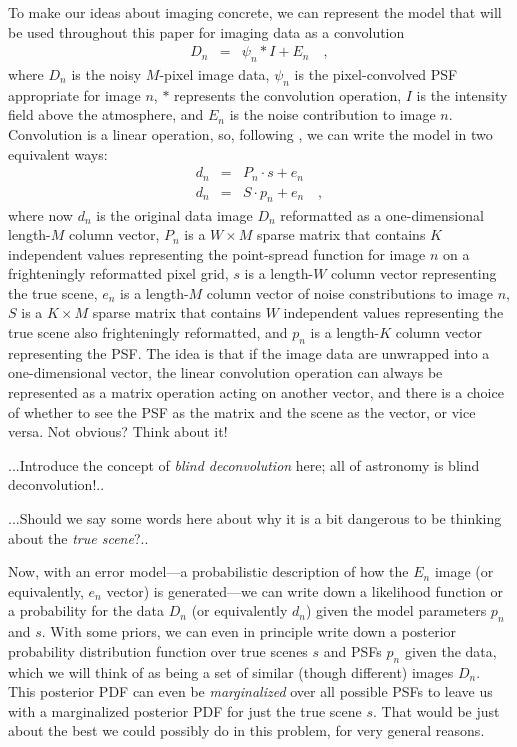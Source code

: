 \documentclass[12pt,preprint]{aastex}
\begin{document}
To make our ideas about imaging concrete, we can represent the model
that will be used throughout this paper for imaging data as a
convolution
\begin{eqnarray}\displaystyle
D_n &=& \psi_n \ast I + E_n
\quad ,
\end{eqnarray}
where $D_n$ is the noisy $M$-pixel image data, $\psi_n$ is the
pixel-convolved PSF appropriate for image $n$, $\ast$ represents the
convolution operation, $I$ is the intensity field above the
atmosphere, and $E_n$ is the noise contribution to image $n$.
Convolution is a linear operation, so, following \citet{hirsch}, we
can write the model in two equivalent ways:
\begin{eqnarray}\displaystyle
d_n &=& P_n \cdot s + e_n
\\
d_n &=& S \cdot p_n + e_n
\quad ,
\end{eqnarray}
where now $d_n$ is the original data image $D_n$ reformatted as a
one-dimensional length-$M$ column vector, $P_n$ is a $W\times M$
sparse matrix that contains $K$ independent values representing the
point-spread function for image $n$ on a frighteningly reformatted
pixel grid, $s$ is a length-$W$ column vector representing the true
scene, $e_n$ is a length-$M$ column vector of noise constributions to
image $n$, $S$ is a $K\times M$ sparse matrix that contains $W$
independent values representing the true scene also frighteningly
reformatted, and $p_n$ is a length-$K$ column vector representing the
PSF.  The idea is that if the image data are unwrapped into a
one-dimensional vector, the linear convolution operation can always be
represented as a matrix operation acting on another vector, and there
is a choice of whether to see the PSF as the matrix and the scene as
the vector, or vice versa.  Not obvious?  Think about it!

...Introduce the concept of \emph{blind deconvolution} here; all of astronomy is blind deconvolution!..

...Should we say some words here about why it is a bit dangerous to be thinking about the \emph{true scene}?..

Now, with an error model---a probabilistic description of how the
$E_n$ image (or equivalently, $e_n$ vector) is generated---we can
write down a likelihood function or a probability for the data $D_n$
(or equivalently $d_n$) given the model parameters $p_n$ and $s$.
With some priors, we can even in principle write down a posterior
probability distribution function over true scenes $s$ and PSFs $p_n$
given the data, which we will think of as being a set of similar
(though different) images $D_n$.  This posterior PDF can even be
\emph{marginalized} over all possible PSFs to leave us with a
marginalized posterior PDF for just the true scene $s$.  That would be
just about the best we could possibly do in this problem, for very
general reasons.
\end{document}
